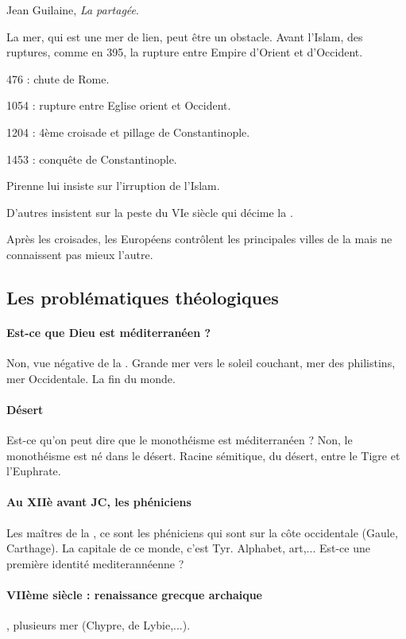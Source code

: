 Jean Guilaine, \textit{La \Med partagée}.

La mer, qui est une mer de lien, peut être un obstacle. Avant l'Islam, des ruptures, comme en 395, la rupture entre Empire d'Orient et d'Occident. 

476 : chute de Rome.

1054 : rupture entre Eglise orient et Occident.

1204 : 4ème croisade et pillage de Constantinople.

1453 : conquête de Constantinople. 

Pirenne lui insiste sur l'irruption de l'Islam. 

D'autres insistent sur la peste du VIe siècle qui décime la \Med. 

Après les croisades, les Européens contrôlent les principales villes de la \Med mais ne connaissent pas mieux l'autre. 

\subsection{Les problématiques théologiques} 

\paragraph{Est-ce que Dieu est méditerranéen ?} Non, vue négative de la \Med. Grande mer vers le soleil couchant, mer des philistins, mer Occidentale. La fin du monde. 

\paragraph{Désert} Est-ce qu'on peut dire que le monothéisme est  méditerranéen ? Non, le monothéisme est né dans le désert. Racine sémitique, du désert, entre le Tigre et l'Euphrate.

\paragraph{Au XIIè avant JC, les phéniciens} Les maîtres de la \Med, ce sont les phéniciens qui sont sur la côte occidentale (Gaule, Carthage). La capitale de ce monde, c'est Tyr. Alphabet, art,... Est-ce une première identité mediterannéenne ? 

\paragraph{VIIème siècle : renaissance grecque archaique} \Med, plusieurs mer (Chypre, de Lybie,...). 

